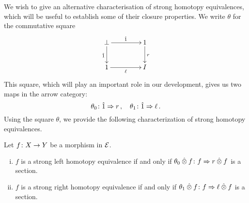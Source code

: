 \documentclass[reqno,10pt,a4paper,oneside]{amsart}
\begin{document}
We wish to give an alternative characterisation of strong homotopy equivalences, which will be useful to establish some of their closure properties. We write $\theta$ for the  commutative square
\begin{equation}
\label{trivial-square}
\begin{gathered}
\xymatrix@C+2em{
  \initial
  \ar[r]^{\hatunit}
  \ar[d]_{\hatunit}
&
  \unit
  \ar[d]^{\intervalr}
\\
  \unit
  \ar[r]_{\intervall}
&
  \interval
}
\end{gathered}
\end{equation}
This square,  which will play an important role in  our development, gives us two maps in the arrow category: 
\[
\theta_{0} \colon \hat{1} \Rightarrow r  \, , \quad \theta_{1} \colon \hat{1} \Rightarrow \ell \,. 
\]
Using the square $\theta$, we provide the following  characterization of strong homotopy equivalences.

\begin{lemma}
\label{strong-h-equiv-as-section}
Let $f \colon X  \to Y$ be a morphism in $\mathcal{E}$.
\begin{enumerate}[(i)]
\item $f$ is a strong left homotopy equivalence if and only if $\theta_{0} \mathbin{\hat{\otimes}} f \colon f \Rightarrow r \mathbin{\hat{\otimes}} f$ is a section.
\item $f$ is a strong right homotopy equivalence if and only if $\theta_{1} \mathbin{\hat{\otimes}} f \colon f \Rightarrow  \ell \mathbin{\hat{\otimes}} f$ is a section.
\end{enumerate}
\end{lemma}
\end{document}
